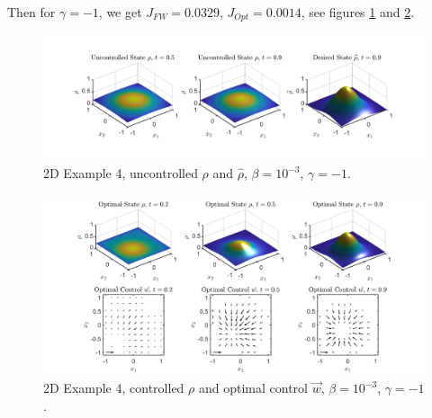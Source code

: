 \documentclass[11pt, a4paper]{article}
\theoremstyle{definition}
\begin{document}
Then for $\gamma = -1$, we get $J_{FW} = 0.0329$, $J_{Opt} = 0.0014$, see figures \ref{rhoHat2dEx4} and \ref{rhoOpt2dEx4}.
\begin{figure}[h]
	\includegraphics[scale=0.3]{Res1Ex4.png}
	\caption{2D Example 4, uncontrolled $\rho$ and $\widehat \rho$, $\beta = 10^{-3}$, $\gamma = -1$.}
	\label{rhoHat2dEx4}
\end{figure}
\begin{figure}[h]
	\includegraphics[scale=0.3]{Res2Ex4.png}
	\caption{2D Example 4, controlled $\rho$ and optimal control $\vec{w}$, $\beta = 10^{-3}$, $\gamma = -1$.}
	\label{rhoOpt2dEx4}
\end{figure}
\end{document}

